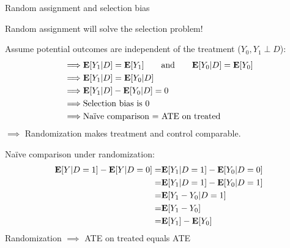 \documentclass[handout, 8pt]{beamer}
\begin{document}
\begin{frame}{Random assignment and selection bias}

Random assignment will solve the selection problem! 

\vspace{2ex}
Assume potential outcomes are independent of the treatment ($Y_0, Y_1 \perp D$):
\begin{align*}
    \implies&
    \mathbf{E} [Y_1 \vert D] = \mathbf{E} [Y_1] \quad\quad
    \text{and} \quad\quad \mathbf{E} [Y_0 \vert D] = \mathbf{E} [Y_0] \\
    \implies&
    \mathbf{E} [Y_1 \vert D] = \mathbf{E} [Y_0 \vert D] \\
    \implies&
    \mathbf{E} [Y_1 \vert D] - \mathbf{E} [Y_0 \vert D] = 0 \\
    \implies&
    \text{Selection bias is 0} \\
    \implies&
    \text{Na{\"i}ve comparison = ATE on treated}
\end{align*}
$\implies$ Randomization makes treatment and control comparable.

\vspace{2ex}
Na{\"i}ve comparison under randomization:
\begin{align*}
    \mathbf{E} [Y \vert D = 1] - \mathbf{E} [Y \vert D=0]  
    =& \mathbf{E} [Y_1 \vert D = 1] - \mathbf{E} [Y_0 \vert D = 0] \\
    =& \mathbf{E} [Y_1 \vert D = 1] - \mathbf{E} [Y_0 \vert D = 1] \\
    =& \mathbf{E} [Y_1 - Y_0 \vert D = 1] \\
    =& \mathbf{E} [Y_1 - Y_0] \\
    =& \mathbf{E} [Y_1] - \mathbf{E} [Y_0]
\end{align*}
Randomization $\implies$ ATE on treated equals ATE


\end{frame}
\end{document}
